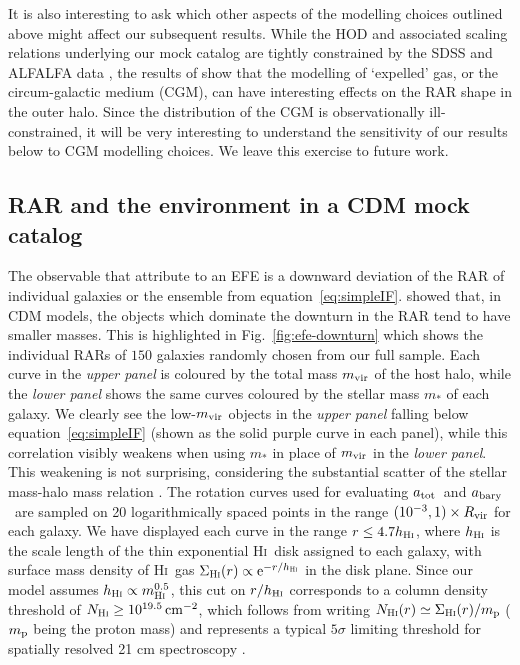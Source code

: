 \documentclass[usenatbib]{mnras}
\newcommand{\Hi}{\textsc{Hi}}
\newcommand{\atot}{\ensuremath{a_{\rm tot}}}
\newcommand{\abary}{\ensuremath{a_{\rm bary}}}
\newcommand{\e}[1]{\ensuremath{{\rm e}^{#1}}}
\newcommand{\eqn}[1]{equation~\eqref{#1}}
\begin{document}
It is also interesting to ask which other aspects of the modelling choices outlined above might affect our subsequent results. While the HOD and associated scaling relations underlying our mock catalog are tightly constrained by the SDSS and ALFALFA data \citep{pcp18,ppp19}, the results of  show that the modelling of `expelled' gas, or the circum-galactic medium (CGM), can have interesting effects on the RAR shape in the outer halo. Since the distribution of the CGM is observationally ill-constrained, it will be very interesting to understand the sensitivity of our results below to CGM modelling choices. We leave this exercise to future work.


\subsection{RAR and the environment in a CDM mock catalog}
\label{subsec:mockEFE}
The observable that  attribute to an EFE is a downward deviation of the RAR of individual galaxies or the ensemble from \eqn{eq:simpleIF}.
 showed that, in CDM models, the objects which dominate the downturn in the RAR tend to have smaller masses. This is highlighted in Fig.~\ref{fig:efe-downturn} which shows the individual RARs of $150$ galaxies randomly chosen from our full sample. Each curve in the \emph{upper panel} is coloured by the total mass $m_{\rm vir}$ of the host halo, while the \emph{lower panel} shows the same curves coloured by the stellar mass $m_\ast$ of each galaxy. We clearly see the low-$m_{\rm vir}$ objects in the \emph{upper panel} falling below \eqn{eq:simpleIF} (shown as the solid purple curve in each panel), while this correlation visibly weakens when using $m_\ast$ in place of $m_{\rm vir}$ in the \emph{lower panel}. This weakening is not surprising, considering the substantial scatter of the stellar mass-halo mass relation . The rotation curves used for evaluating \atot\ and \abary\ are sampled on 20 logarithmically spaced points in the range $(10^{-3},1)\times R_{\rm vir}$ for each  galaxy. We have displayed each curve in the range $r\leq4.7h_{\Hi}$, where $h_{\Hi}$ is the scale length of the thin exponential \Hi\ disk assigned to each galaxy, with surface mass density of \Hi\ gas $\Sigma_{\Hi}(r)\propto\e{-r/h_{\Hi}}$ in the disk plane. Since our model assumes $h_{\Hi}\propto m_{\Hi}^{0.5}$, this cut on $r/h_{\Hi}$ corresponds to a column density threshold of $N_{\Hi}\geq10^{19.5}\,{\rm cm}^{-2}$, which follows from writing $N_{\Hi}(r)\simeq\Sigma_{\Hi}(r)/m_{\rm p}$ ($m_{\rm p}$ being the proton mass) and represents a typical $5\sigma$ limiting threshold for spatially resolved 21 cm spectroscopy \citep[e.g.,][]{bc04,bfos06,ccdf06,boomsma+08}.
\end{document}
